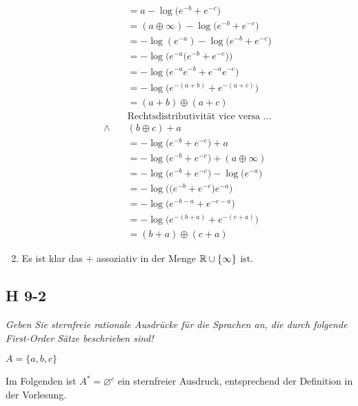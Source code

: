 \documentclass{scrartcl}
\begin{document}
\begin{enumerate}
\begin{align*}
            &= a -\log\big(e^{-b} + e^{-c}\big)\\
            &= (a \oplus \infty) -\log\big(e^{-b} + e^{-c}\big)\\
            &= -\log(e^{-a}) -\log\big(e^{-b} + e^{-c}\big)\\
            &= -\log\Big(e^{-a}\big(e^{-b} + e^{-c}\big)\Big)\\
            &= -\log\Big(e^{-a}e^{-b} + e^{-a}e^{-c}\Big)\\
            &= -\log\Big(e^{-(a+b)} + e^{-(a+c)}\Big)\\
            &= (a + b) \oplus (a + c)\\
            &\text{Rechtsdistributivität vice versa \ldots}\\
            \land\quad& (b \oplus c) + a\\
            &= -\log\big(e^{-b} + e^{-c}\big) + a\\
            &= -\log\big(e^{-b} + e^{-c}\big) + (a \oplus \infty)\\
            &= -\log\big(e^{-b} + e^{-c}\big) -\log\big(e^{-a}\big)\\
            &= -\log\Big(\big(e^{-b} + e^{-c}\big)e^{-a}\Big)\\
            &= -\log\Big(e^{-b-a} + e^{-c-a}\Big)\\
            &= -\log\Big(e^{-(b+a)} + e^{-(c+a)}\Big)\\
            &= (b + a) \oplus (c + a)
    \end{align*}
    \item Es ist klar das $+$ assoziativ in der Menge $\mathbb{R} \cup \{\infty\}$ ist.
\end{enumerate}

\subsection{H 9-2}

\textsl{Geben Sie \emph{sternfreie rationale Ausdrücke} für die Sprachen an, die durch folgende First-Order Sätze beschrieben sind!}

$A = \big\{a,b,c\big\}$

Im Folgenden ist $A^* = \varnothing^c$ ein sternfreier Ausdruck, entsprechend der Definition in der Vorlesung.
\end{document}
